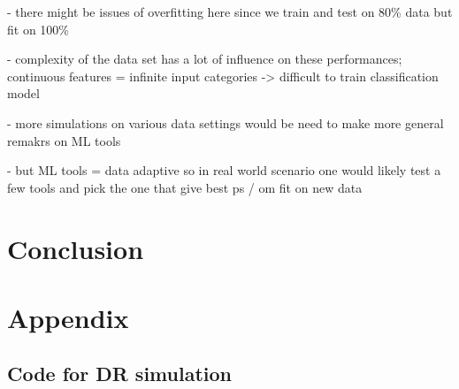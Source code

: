 \documentclass[12pt,twoside]{article}
\begin{document}
- there might be issues of overfitting here since we train and test on 80\% data but fit on 100\%

- complexity of the data set has a lot of influence on these performances; continuous features = infinite input categories -> difficult to train classification model 

- more simulations on various data settings would be need to make more general remakrs on ML tools

- but ML tools = data adaptive so in real world scenario one would likely test a few tools and pick the one that give best ps / om fit on new data 

\section{Conclusion}

\clearpage
\section{Appendix}

\subsection*{Code for DR simulation}



\clearpage


\end{document}
